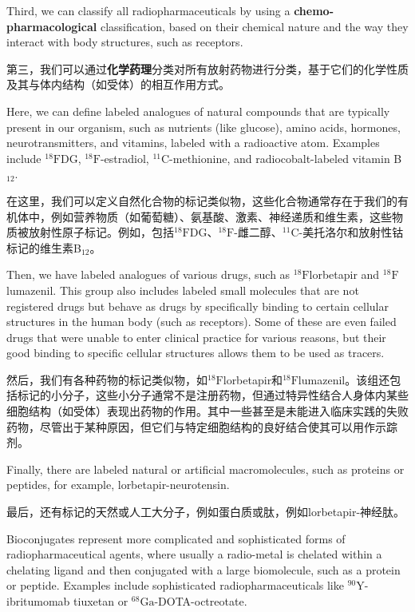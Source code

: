 \documentclass[dvipsnames, svgnames,a4paper,11pt]{article}
\begin{document}
Third, we can classify all radiopharmaceuticals by using a \textbf{chemo-pharmacological} classification, based on their chemical nature and the way they interact with body structures, such as receptors.

第三，我们可以通过\textbf{化学药理}分类对所有放射药物进行分类，基于它们的化学性质及其与体内结构（如受体）的相互作用方式。

Here, we can define labeled analogues of natural compounds that are typically present in our organism, such as nutrients (like glucose), amino acids, hormones, neurotransmitters, and vitamins, labeled with a radioactive atom. Examples include ${}^\text{18}\text{F}$DG, ${}^\text{18}\text{F}$-estradiol, ${}^\text{11}\text{C}$-methionine, and radiocobalt-labeled vitamin B${}_{12}$.

在这里，我们可以定义自然化合物的标记类似物，这些化合物通常存在于我们的有机体中，例如营养物质（如葡萄糖）、氨基酸、激素、神经递质和维生素，这些物质被放射性原子标记。例如，包括${}^\text{18}\text{F}$DG、${}^\text{18}\text{F}$-雌二醇、${}^\text{11}\text{C}$-美托洛尔和放射性钴标记的维生素B${}_{12}$。


Then, we have labeled analogues of various drugs, such as ${}^\text{18}\text{F}$lorbetapir and ${}^\text{18}\text{F}$lumazenil. This group also includes labeled small molecules that are not registered drugs but behave as drugs by specifically binding to certain cellular structures in the human body (such as receptors). Some of these are even failed drugs that were unable to enter clinical practice for various reasons, but their good binding to specific cellular structures allows them to be used as tracers.

然后，我们有各种药物的标记类似物，如${}^\text{18}\text{F}$lorbetapir和${}^\text{18}\text{F}$lumazenil。该组还包括标记的小分子，这些小分子通常不是注册药物，但通过特异性结合人身体内某些细胞结构（如受体）表现出药物的作用。其中一些甚至是未能进入临床实践的失败药物，尽管出于某种原因，但它们与特定细胞结构的良好结合使其可以用作示踪剂。

Finally, there are labeled natural or artificial macromolecules, such as proteins or peptides, for example, lorbetapir-neurotensin.

最后，还有标记的天然或人工大分子，例如蛋白质或肽，例如lorbetapir-神经肽。

Bioconjugates represent more complicated and sophisticated forms of radiopharmaceutical agents, where usually a radio-metal is chelated within a chelating ligand and then conjugated with a large biomolecule, such as a protein or peptide. Examples include sophisticated radiopharmaceuticals like ${}^\text{90}\text{Y}$-ibritumomab tiuxetan or ${}^\text{68}\text{Ga}$-DOTA-octreotate.
\end{document}
